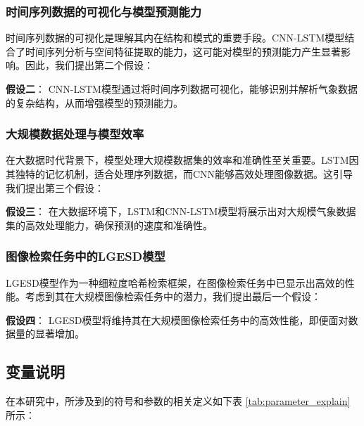 \subsubsection{时间序列数据的可视化与模型预测能力}

时间序列数据的可视化是理解其内在结构和模式的重要手段。CNN-LSTM模型结合了时间序列分析与空间特征提取的能力，这可能对模型的预测能力产生显著影响。因此，我们提出第二个假设：

\textbf{假设二}： CNN-LSTM模型通过将时间序列数据可视化，能够识别并解析气象数据的复杂结构，从而增强模型的预测能力。

\subsubsection{大规模数据处理与模型效率}

在大数据时代背景下，模型处理大规模数据集的效率和准确性至关重要。LSTM因其独特的记忆机制，适合处理序列数据，而CNN能够高效处理图像数据。这引导我们提出第三个假设：

\textbf{假设三}： 在大数据环境下，LSTM和CNN-LSTM模型将展示出对大规模气象数据集的高效处理能力，确保预测的速度和准确性。

\subsubsection{图像检索任务中的LGESD模型}

LGESD模型作为一种细粒度哈希检索框架，在图像检索任务中已显示出高效的性能。考虑到其在大规模图像检索任务中的潜力，我们提出最后一个假设：

\textbf{假设四}： LGESD模型将维持其在大规模图像检索任务中的高效性能，即便面对数据量的显著增加。

\subsection{变量说明}

在本研究中，所涉及到的符号和参数的相关定义如下表 \ref{tab:parameter_explain} 所示：

